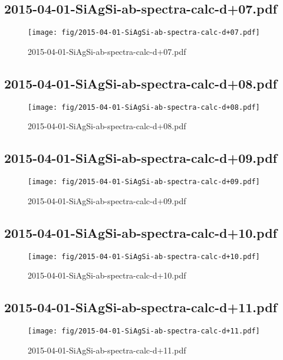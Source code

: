 \documentclass[fullscreen=true]{beamer}
\begin{document}
\subsection{2015-04-01-SiAgSi-ab-spectra-calc-d+07.pdf}
\begin{frame}
  \begin{figure}
    \texttt{[image: fig/2015-04-01-SiAgSi-ab-spectra-calc-d+07.pdf]}%
    \caption{2015-04-01-SiAgSi-ab-spectra-calc-d+07.pdf}
  \end{figure}
\end{frame}

\subsection{2015-04-01-SiAgSi-ab-spectra-calc-d+08.pdf}
\begin{frame}
  \begin{figure}
    \texttt{[image: fig/2015-04-01-SiAgSi-ab-spectra-calc-d+08.pdf]}%
    \caption{2015-04-01-SiAgSi-ab-spectra-calc-d+08.pdf}
  \end{figure}
\end{frame}

\subsection{2015-04-01-SiAgSi-ab-spectra-calc-d+09.pdf}
\begin{frame}
  \begin{figure}
    \texttt{[image: fig/2015-04-01-SiAgSi-ab-spectra-calc-d+09.pdf]}%
    \caption{2015-04-01-SiAgSi-ab-spectra-calc-d+09.pdf}
  \end{figure}
\end{frame}

\subsection{2015-04-01-SiAgSi-ab-spectra-calc-d+10.pdf}
\begin{frame}
  \begin{figure}
    \texttt{[image: fig/2015-04-01-SiAgSi-ab-spectra-calc-d+10.pdf]}%
    \caption{2015-04-01-SiAgSi-ab-spectra-calc-d+10.pdf}
  \end{figure}
\end{frame}

\subsection{2015-04-01-SiAgSi-ab-spectra-calc-d+11.pdf}
\begin{frame}
  \begin{figure}
    \texttt{[image: fig/2015-04-01-SiAgSi-ab-spectra-calc-d+11.pdf]}%
    \caption{2015-04-01-SiAgSi-ab-spectra-calc-d+11.pdf}
  \end{figure}
\end{frame}
\end{document}

